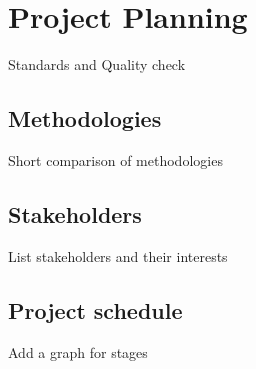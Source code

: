 \documentclass[12pt,a4paper]{report}
\begin{document}
\chapter{Project Planning}

Standards and Quality check
\section{Methodologies}
Short comparison of methodologies
\section{Stakeholders}
List stakeholders and their interests
\section{Project schedule}
Add a graph for stages


\end{document}
